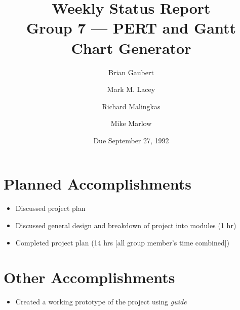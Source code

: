 
\title{Weekly Status Report \\
	Group 7 --- PERT and Gantt Chart Generator}

\author{Brian Gaubert \and Mark M. Lacey \and Richard Malingkas \and
	Mike Marlow}

\date{Due September 27, 1992}

\maketitle

%
%
%
\section{Planned Accomplishments}
\begin{itemize}
\item Discussed project plan
\item Discussed general design and breakdown of project into modules
	(1 hr)
\item Completed project plan (14 hrs [all group member's time
	combined])
\end{itemize}

%
%
%
\section{Other Accomplishments}
\begin{itemize}
	\item Created a working prototype of the project using 
		{\em guide}
\end{itemize}

%
%
%

